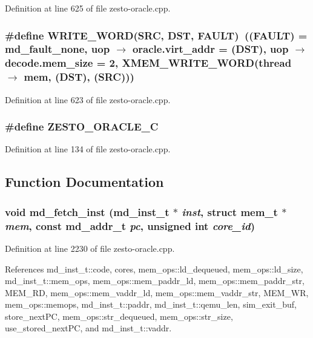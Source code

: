 Definition at line 625 of file zesto-oracle.cpp.
\subsubsection[{WRITE\_\-WORD}]{\setlength{\rightskip}{0pt plus 5cm}\#define WRITE\_\-WORD(SRC, \/  DST, \/  FAULT)~((FAULT) = md\_\-fault\_\-none, uop $\rightarrow$ oracle.virt\_\-addr = (DST), uop $\rightarrow$ decode.mem\_\-size = 2, XMEM\_\-WRITE\_\-WORD(thread $\rightarrow$ mem, (DST), (SRC)))}\label{zesto-oracle_8cpp_39396193613c8f3b1a09a4ff205c16da}




Definition at line 623 of file zesto-oracle.cpp.
\subsubsection[{ZESTO\_\-ORACLE\_\-C}]{\setlength{\rightskip}{0pt plus 5cm}\#define ZESTO\_\-ORACLE\_\-C}\label{zesto-oracle_8cpp_205e53e866813d3a0aab9decb7becf26}




Definition at line 134 of file zesto-oracle.cpp.

\subsection{Function Documentation}
\subsubsection[{md\_\-fetch\_\-inst}]{\setlength{\rightskip}{0pt plus 5cm}void md\_\-fetch\_\-inst ({\bf md\_\-inst\_\-t} $\ast$ {\em inst}, \/  struct {\bf mem\_\-t} $\ast$ {\em mem}, \/  const {\bf md\_\-addr\_\-t} {\em pc}, \/  unsigned int {\em core\_\-id})}\label{zesto-oracle_8cpp_c9b36de1d166dbea41697884bd42aa7e}




Definition at line 2230 of file zesto-oracle.cpp.

References md\_\-inst\_\-t::code, cores, mem\_\-ops::ld\_\-dequeued, mem\_\-ops::ld\_\-size, md\_\-inst\_\-t::mem\_\-ops, mem\_\-ops::mem\_\-paddr\_\-ld, mem\_\-ops::mem\_\-paddr\_\-str, MEM\_\-RD, mem\_\-ops::mem\_\-vaddr\_\-ld, mem\_\-ops::mem\_\-vaddr\_\-str, MEM\_\-WR, mem\_\-ops::memops, md\_\-inst\_\-t::paddr, md\_\-inst\_\-t::qemu\_\-len, sim\_\-exit\_\-buf, store\_\-nextPC, mem\_\-ops::str\_\-dequeued, mem\_\-ops::str\_\-size, use\_\-stored\_\-nextPC, and md\_\-inst\_\-t::vaddr.
